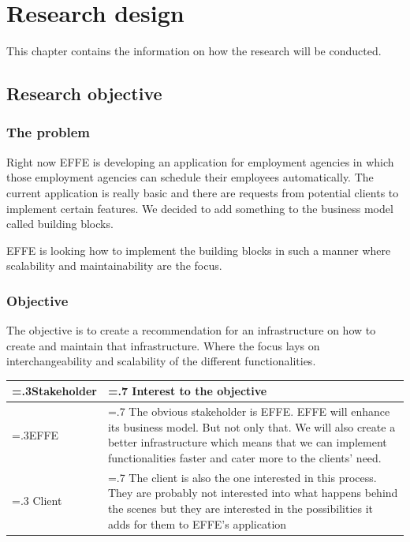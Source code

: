 
\chapter{Research design}
This chapter contains the information on how the research will be conducted.

\section{Research objective}

\subsection{The problem}
\label{sec:TheProblem}

Right now EFFE is developing an application for employment agencies in which those employment agencies can schedule their employees automatically. The current application is really basic and there are requests from potential clients to implement certain features. We decided to add something to the business model called building blocks.


EFFE is looking how to implement the building blocks in such a manner where scalability and maintainability are the focus.

\subsection{Objective}
The objective is to create a recommendation for an infrastructure on how to create and maintain that infrastructure. Where the focus lays on interchangeability and scalability of the different functionalities.

\begin{tabularx}{\linewidth}{|>{\hsize=.3\hsize}X|>{\hsize=.7\hsize}X|}
	\hline
	Stakeholder &
	Interest to the objective
	\\
	\hline
	EFFE &
	The obvious stakeholder is EFFE. EFFE will enhance its business model. But not only that. We will also create a better infrastructure which means that we can implement functionalities faster and cater more to the clients’ need.
	\\
	\hline
	Client &
	The client is also the one interested in this process. They are probably not interested into what happens behind the scenes but they are interested in the possibilities it adds for them to EFFE’s application
	\\
	\hline
\end{tabularx}

